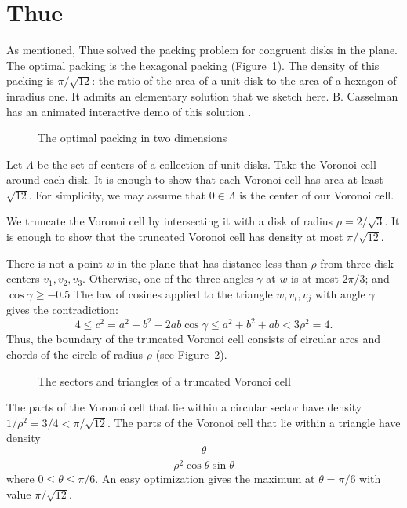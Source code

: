 \section{Thue}\label{sec:thue}


As mentioned, 
Thue solved the  packing problem for congruent disks in the plane.
The optimal packing is the hexagonal packing (Figure~\ref{fig:2D-hex}). 
The density of this packing is $\pi/\sqrt{12}$: the ratio of the
area of a unit disk to the area of a hexagon of inradius one.
It admits an elementary solution that we sketch here.  B. Casselman
has an animated interactive demo of this solution \cite{casselman:pennies}.

\begin{figure}[htb]
  \centering
  \caption{The optimal packing in two dimensions}
  \label{fig:2D-hex}
\end{figure}

Let $\Lambda$ be the set of centers of a collection of unit disks.
Take the Voronoi cell around each disk.  It is enough to show that
each Voronoi cell has area at least $\sqrt{12}$.  For simplicity,
we may assume that $0\in\Lambda$ is the center of our Voronoi cell.  

We truncate the Voronoi cell by intersecting it with a disk of radius
$\rho=2/\sqrt3$.  It is enough to show that the truncated Voronoi cell has
density  at most $\pi/\sqrt{12}$.  

There is not a point $w$ in the plane that has distance less than $\rho$
from three disk centers $v_1,v_2,v_3$.  Otherwise, one of the three
angles $\gamma$ at $w$ is at most $2\pi/3$; and $\cos\gamma\ge -0.5$  
The law of cosines applied
to the triangle $w,v_i,v_j$ with angle $\gamma$ gives the contradiction:
   $$
   4 \le c^2 = a^2 + b^2 - 2 a b \cos\gamma 
   \le a^2 + b^2 + a b < 3\rho^2 = 4.
   $$
Thus, the boundary of the truncated Voronoi cell consists of circular
arcs and chords of the circle of radius $\rho$ (see Figure~\ref{fig:2D-proof}).

\begin{figure}[htb]
  \centering
  \caption{The sectors and triangles of a truncated Voronoi cell}
  \label{fig:2D-proof}
\end{figure}

The
parts of the Voronoi cell that lie within a circular sector have density
$1/\rho^2 = 3/4 < \pi/\sqrt{12}$.  The
parts of the Voronoi cell that
lie within a triangle have density
   \begin{equation}\label{eqn:rog2d}
   \frac{\theta}{\rho^2 \cos\theta\sin\theta}
   \end{equation}
where $0 \le \theta\le \pi/6$.  An easy optimization gives the maximum
at $\theta=\pi/6$ with value $\pi/\sqrt{12}$.

